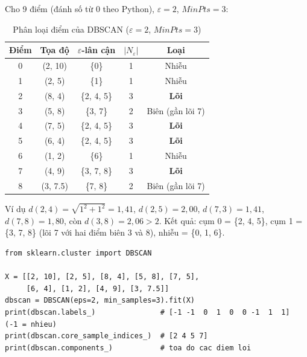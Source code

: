 \begin{example}
Cho 9 điểm (đánh số từ 0 theo Python), $\varepsilon = 2$, $\mathit{MinPts} = 3$:
\end{example}

\begin{table}[H]
\centering
\begin{tabular}{|c|c|c|c|c|}
\hline
\textbf{Điểm} & \textbf{Tọa độ} & \textbf{$\varepsilon$-lân cận} & \textbf{$|N_\varepsilon|$} & \textbf{Loại} \\
\hline
0 & (2, 10) & \{0\} & 1 & Nhiễu \\ \hline
1 & (2, 5) & \{1\} & 1 & Nhiễu \\ \hline
2 & (8, 4) & \{2, 4, 5\} & 3 & \textbf{Lõi} \\ \hline
3 & (5, 8) & \{3, 7\} & 2 & Biên (gần lõi 7) \\ \hline
4 & (7, 5) & \{2, 4, 5\} & 3 & \textbf{Lõi} \\ \hline
5 & (6, 4) & \{2, 4, 5\} & 3 & \textbf{Lõi} \\ \hline
6 & (1, 2) & \{6\} & 1 & Nhiễu \\ \hline
7 & (4, 9) & \{3, 7, 8\} & 3 & \textbf{Lõi} \\ \hline
8 & (3, 7.5) & \{7, 8\} & 2 & Biên (gần lõi 7) \\ \hline
\end{tabular}
\caption{Phân loại điểm của DBSCAN ($\varepsilon = 2$, $\mathit{MinPts} = 3$)}
\label{tab:dbscan}
\end{table}

Ví dụ $d(2, 4) = \sqrt{1^2 + 1^2} = 1{,}41$, $d(2, 5) = 2{,}00$, $d(7, 3) = 1{,}41$, $d(7, 8) = 1{,}80$, còn $d(3, 8) = 2{,}06 > 2$. Kết quả: cụm 0 = \{2, 4, 5\}, cụm 1 = \{3, 7, 8\} (lõi 7 với hai điểm biên 3 và 8), nhiễu = \{0, 1, 6\}.

\begin{lstlisting}[caption={DBSCAN với scikit-learn (ví dụ trên lớp)}]
from sklearn.cluster import DBSCAN

X = [[2, 10], [2, 5], [8, 4], [5, 8], [7, 5],
     [6, 4], [1, 2], [4, 9], [3, 7.5]]
dbscan = DBSCAN(eps=2, min_samples=3).fit(X)
print(dbscan.labels_)               # [-1 -1  0  1  0  0 -1  1  1]  (-1 = nhieu)
print(dbscan.core_sample_indices_)  # [2 4 5 7]
print(dbscan.components_)           # toa do cac diem loi
\end{lstlisting}


